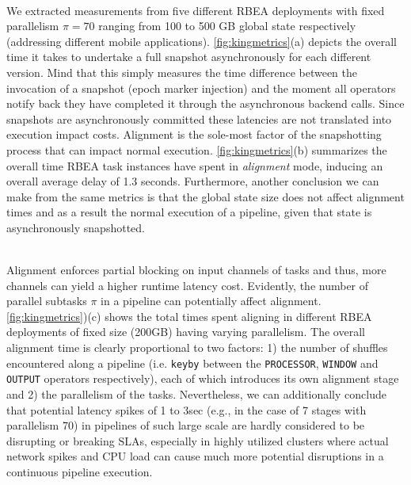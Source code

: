  \\
We extracted measurements from five different RBEA deployments with fixed parallelism $\pi = 70$ ranging from 100 to 500 GB global state respectively (addressing different mobile applications). \autoref{fig:kingmetrics}(a) depicts the overall time it takes to undertake a full snapshot asynchronously for each different version. Mind that this simply measures the time difference between the invocation of a snapshot (epoch marker injection) and the moment all operators notify back they have completed it through the asynchronous backend calls. Since snapshots are asynchronously committed these latencies are not translated into execution impact costs. Alignment is the sole-most factor of the snapshotting process that can impact normal execution. \autoref{fig:kingmetrics}(b) summarizes the overall time RBEA task instances have spent in \emph{alignment} mode, inducing an overall average delay of 1.3 seconds. Furthermore, another conclusion we can make from the same metrics is that the global state size does not affect alignment times and as a result the normal execution of a pipeline, given that state is asynchronously snapshotted.

 \\
Alignment enforces partial blocking  on input channels of tasks and thus, more channels can yield a higher runtime latency cost. Evidently, the number of parallel subtasks $\pi$ in a pipeline can potentially affect alignment. \autoref{fig:kingmetrics})(c) shows the total times spent aligning in different RBEA deployments of fixed size (200GB) having varying parallelism. The overall alignment time is clearly proportional to two factors: 1) the number of shuffles encountered along a pipeline (i.e. \texttt{keyby} between the \texttt{PROCESSOR}, \texttt{WINDOW} and \texttt{OUTPUT} operators respectively), each of which introduces its own alignment stage and 2) the parallelism of the tasks. Nevertheless, we can additionally conclude that potential latency spikes of 1 to 3sec (e.g., in the case of 7 stages with parallelism 70) in pipelines of such large scale are hardly considered to be disrupting or breaking SLAs, especially in highly utilized clusters where actual network spikes and CPU load can cause much more potential disruptions in a continuous pipeline execution.